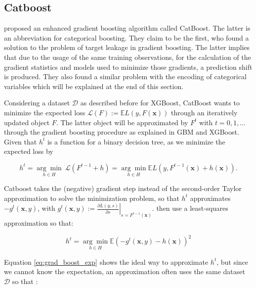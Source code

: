 \documentclass[12pt,a4paper]{article}
\begin{document}
\hypertarget{catboost}{%
\subsection{\texorpdfstring{Catboost \label{seq:catboost}}{Catboost }}\label{catboost}}

\textcite{Prokhorenkova2019} proposed an enhanced gradient boosting algorithm called CatBoost. The latter is an abbreviation for categorical boosting. They claim to be the first, who found a solution to the problem of target leakage in gradient boosting. The latter implies that due to the usage of the same training observations, for the calculation of the gradient statistics and models used to minimize those gradients, a prediction shift is produced. They also found a similar problem with the encoding of categorical variables which will be explained at the end of this section.

Considering a dataset \(\mathcal{D}\) as described before for XGBoost, CatBoost wants to minimize the expected loss \(\mathcal{L}(F):=\mathbb{E} L(y, F(\mathbf{x}))\) through an iteratively updated object \(F\). The latter object will be approximated by \(F^t\) with \(t = 0,1,\ldots\) through the gradient boosting procedure as explained in GBM and XGBoost. Given that \(h^t\) is a function for a binary decision tree, as we minimize the expected loss by

\begin{equation}
h^{t}=\underset{h \in H}{\arg \min} \ \mathcal{L}\left(F^{t-1}+h\right)=\underset{h \in H}{\arg \min } \mathbb{E} L\left(y, F^{t-1}(\mathbf{x})+h(\mathbf{x})\right).
\end{equation}

Catboost takes the (negative) gradient step instead of the second-order Taylor approximation to solve the minimization problem, so that \(h^t\) approximates \(-g^t(\mathbf{x},y)\), with \(g^{t}(\mathbf{x}, y):=\left.\frac{\partial L(y, s)}{\partial s}\right|_{s=F^{t-1}(\mathbf{x})}\). \textcite{Prokhorenkova2019} then use a least-squares approximation so that:

\begin{equation}
h^{t}=\underset{h \in H}{\arg \min } \mathbb{E}\left(-g^{t}(\mathbf{x}, y)-h(\mathbf{x})\right)^{2}
\label{eq:grad_boost_exp}
\end{equation}

Equation \ref{eq:grad_boost_exp} shows the ideal way to approximate \(h^t\), but since we cannot know the expectation, an approximation often uses the same dataset \(\mathcal{D}\) so that :
\end{document}
